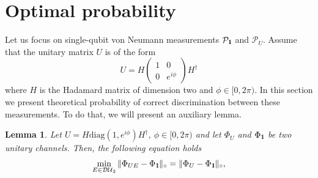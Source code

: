 \documentclass[preprint,12pt, a4paper, dvipsnames]{elsarticle}
\newcommand{\1}{{\rm 1\hspace{-0.9mm}l}}
\newcommand{\Id}{{\rm 1\hspace{-0.9mm}l}}
\newcommand{\ee}{\ensuremath{\mathrm{e}}}
\newcommand{\ii}{\ensuremath{\mathrm{i}}}
\newcommand{\PP}{\mathcal{P}}
\newcommand{\diaguni}{\ensuremath{\mathcal{DU}}}
\newcommand{\diag}{\mathrm{diag}}
\newtheorem{lemma}{Lemma}
\begin{document}
\section{Optimal probability} \label{app:optimal-probability}


Let us focus on single-qubit von Neumann measurements $\PP_\1$ and $\PP_U$.
Assume that the unitary matrix $U$ is of the form
\begin{equation}
U = H
\left(\begin{array}{cc}1&0\\0&e^{i \phi}\end{array}\right)  H^\dagger
\end{equation}
where $H$ is the Hadamard matrix of dimension two and $\phi \in [0, 2 \pi)$.
In this section we present theoretical probability of correct
discrimination between these measurements. To do that, we will present an auxiliary lemma.
\begin{lemma}\label{lemma:min-e-optimal}
	Let $U = H \diag(1, e^{i \phi}) H^\dagger$, $\phi \in [0, 2\pi)$ and	let
	$\Phi_U$ and $\Phi_\Id$ be two unitary channels. Then, the following equation holds
	\begin{equation}
	\min_{E \in \diaguni_2} \|\Phi_{UE} -
	\Phi_\Id\|_\diamond = \|\Phi_{U} -
	\Phi_\Id\|_\diamond,
	\end{equation}
\end{lemma}
\end{document}
